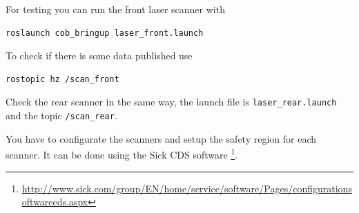 For testing you can run the front laser scanner with
\begin{lstlisting}
roslaunch cob_bringup laser_front.launch
\end{lstlisting}

To check if there is some data published use
\begin{lstlisting}
rostopic hz /scan_front
\end{lstlisting}

Check the rear scanner in the same way, the launch file is \texttt{laser\_rear.launch} and the topic \texttt{/scan\_rear}.

You have to configurate the scanners and setup the safety region for each scanner. It can be done using the Sick CDS software \footnote{\url{http://www.sick.com/group/EN/home/service/software/Pages/configurationsoftwarecds.aspx}}.

